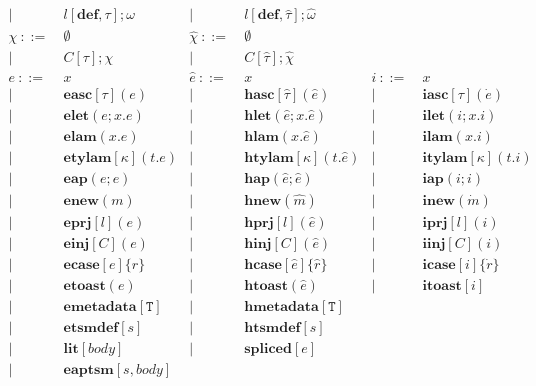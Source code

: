 \documentclass{sig-alternate}
\newcommand{\T}{\mathtt{T}}
\begin{document}
\[\begin{array}{rlrlrl}
   |~&  ~l[\mathbf{def}, \tau];\omega       &|~ & ~l[\mathbf{def}, \hat\tau];\hat\omega\\
   \chi       ~::=&~  \emptyset         &\hat\chi ~::=&~  \emptyset\\
   |~&  ~C[\tau];\chi               &|~&  ~C[\hat\tau];\hat{\chi}\\
  e       ~::=&~ x                &\hat{e}  ~::=&~  x                     & i     ~::=&~  x\\
        | ~ &~ \mathbf{easc}[\tau](e)     &       | ~ &~  \mathbf{hasc}[\hat\tau](\hat{e})    &       | ~ &~  \mathbf{iasc}[\tau](\dot{e})\\
        | ~ &~ \mathbf{elet}(e; x.e)        &       | ~ &~  \mathbf{hlet}(\hat{e}; x.\hat{e})   &       | ~ &~  \mathbf{ilet}(i;x.i)\\
        | ~ &~ \mathbf{elam}(x.e)           &       | ~ &~  \mathbf{hlam}(x.\hat{e})        &       | ~ &~  \mathbf{ilam}(x.i)\\
        | ~ &~ \mathbf{etylam}[\kappa](t.e)     &       | ~ &~  \mathbf{htylam}[\kappa](t.\hat{e})    &       | ~ &~  \mathbf{itylam}[\kappa](t.i)\\
        | ~ &~ \mathbf{eap}(e;e)          &       | ~ &~  \mathbf{hap}(\hat{e};\hat{e})     &       | ~ &~  \mathbf{iap}(i;i)\\
        | ~ &~ \mathbf{enew}(m)           &       | ~ &~  \mathbf{hnew}(\hat{m})          &       | ~ &~  \mathbf{inew}(\dot{m})\\
        | ~ &~ \mathbf{eprj}[l](e)          &       | ~ &~  \mathbf{hprj}[l](\hat{e})       &       | ~ &~  \mathbf{iprj}[l](i)\\
        | ~ &~ \mathbf{einj}[C](e)          &       | ~ &~  \mathbf{hinj}[C](\hat{e})       &       | ~ &~  \mathbf{iinj}[C](i)\\
        | ~ &~ \mathbf{ecase}[e]\{r\}         &       | ~ &~  \mathbf{hcase}[\hat{e}]\{\hat{r}\}    &       | ~ &~  \mathbf{icase}[i]\{\dot{r}\}\\
        | ~ &~ \mathbf{etoast}(e)           &       | ~ &~  \mathbf{htoast}(\hat{e})        &       | ~ &~  \mathbf{itoast}[i]\\
        | ~ &~ \mathbf{emetadata}[\T]         &       | ~ &~  \mathbf{hmetadata}[\T]\\
        | ~ &~ \mathbf{etsmdef}[s]        &       | ~ &~  \mathbf{htsmdef}[s]\\
        | ~ &~ \mathbf{lit}[body]       &       | ~ &~  \mathbf{spliced}[e]\\
        | ~ &~ \mathbf{eaptsm}[s,body]\\

\end{array}\]
\end{document}

